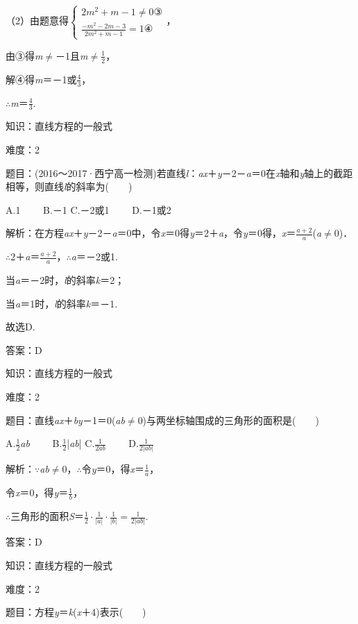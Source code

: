\documentclass{article} %
\begin{document}
（2）由题意得$\left\{\begin{array}{l} 2m^2+m-1\neq 0 \text{③}\\ \frac{-m^2-2m-3}{2m^2+m-1}=1\text{④} \end{array}\right.$，

由③得\textit{m}$\mathrm{\neq}$－1且\textit{m}$\mathrm{\neq}\frac{1}{2}$，

解④得\textit{m}＝－1或$\frac{4}{3}$，

$\mathrm{\therefore}$\textit{m}＝$\frac{4}{3}$.

知识：直线方程的一般式

难度：2

题目：(2016～2017·西宁高一检测)若直线\textit{l}：\textit{ax}＋\textit{y}－2－\textit{a}＝0在\textit{x}轴和\textit{y}轴上的截距相等，则直线\textit{l}的斜率为(　　)

A.1　　 B.－1 C.－2或1　　 D.－1或2

解析：在方程\textit{ax}＋\textit{y}－2－\textit{a}＝0中，令\textit{x}＝0得\textit{y}＝2＋\textit{a}，令\textit{y}＝0得，\textit{x}＝$\frac{a+2}{a}$(\textit{a}$\mathrm{\neq}$0)．

$\mathrm{\therefore}$2＋\textit{a}＝$\frac{a+2}{a}$，$\mathrm{\therefore}$\textit{a}＝－2或1.

当\textit{a}＝－2时，\textit{l}的斜率\textit{k}＝2；

当\textit{a}＝1时，\textit{l}的斜率\textit{k}＝－1.

故选D.

答案：D

知识：直线方程的一般式

难度：2

题目：直线\textit{ax}＋\textit{by}－1＝0(\textit{ab}$\mathrm{\neq}$0)与两坐标轴围成的三角形的面积是(　　)

A.$\frac{1}{2}$\textit{ab}　　 B.$\frac{1}{2}$|\textit{ab}| C.$\frac{1}{2ab}$　　 D.$\frac{1}{2|ab|}$

解析：$\mathrm{\because}$\textit{ab}$\mathrm{\neq}$0，$\mathrm{\therefore}$令\textit{y}＝0，得\textit{x}＝$\frac{1}{a}$，

令\textit{x}＝0，得\textit{y}＝$\frac{1}{b}$，

$\mathrm{\therefore}$三角形的面积\textit{S}＝$\frac{1}{2}\cdot\frac{1}{|a|}\cdot\frac{1}{|b|}=\frac{1}{2|ab|}$.

答案：D

知识：直线方程的一般式

难度：2

题目：方程\textit{y}＝\textit{k}(\textit{x}＋4)表示(　　)
\end{document}
